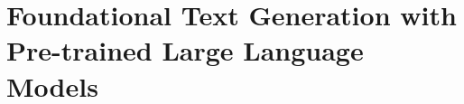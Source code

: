 ﻿%
\chapter{Foundational Text Generation with Pre-trained Large Language Models}
\label{ch:foundational-text-generation}




